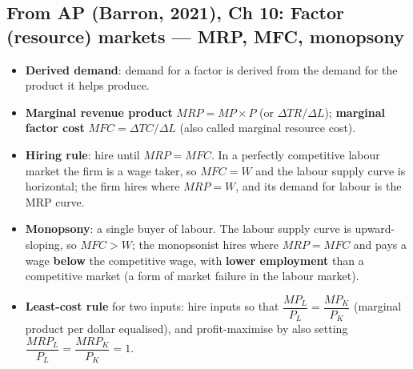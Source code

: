 \documentclass[a4paper,12pt]{article}
\newcommand{\needbold}[1]{\textcolor{red!70!black}{\textbf{#1}}}
\begin{document}
\subsection*{From AP (Barron, 2021), Ch 10: Factor (resource) markets --- MRP, MFC, monopsony}
\begin{itemize}
  \item \needbold{Derived demand}: demand for a factor is derived from the demand for the product it helps produce.
  \item \needbold{Marginal revenue product} $MRP = MP \times P$ (or $\Delta TR/\Delta L$); \needbold{marginal factor cost} $MFC = \Delta TC/\Delta L$ (also called marginal resource cost).
  \item \textbf{Hiring rule}: hire until $MRP = MFC$. In a perfectly competitive labour market the firm is a wage taker, so $MFC = W$ and the labour supply curve is horizontal; the firm hires where $MRP = W$, and its demand for labour is the MRP curve.
  \item \needbold{Monopsony}: a single buyer of labour. The labour supply curve is upward-sloping, so $MFC > W$; the monopsonist hires where $MRP = MFC$ and pays a wage \textbf{below} the competitive wage, with \textbf{lower employment} than a competitive market (a form of market failure in the labour market).
  \item \textbf{Least-cost rule} for two inputs: hire inputs so that $\dfrac{MP_L}{P_L} = \dfrac{MP_K}{P_K}$ (marginal product per dollar equalised), and profit-maximise by also setting $\dfrac{MRP_L}{P_L} = \dfrac{MRP_K}{P_K} = 1$.
\end{itemize}
\end{document}
